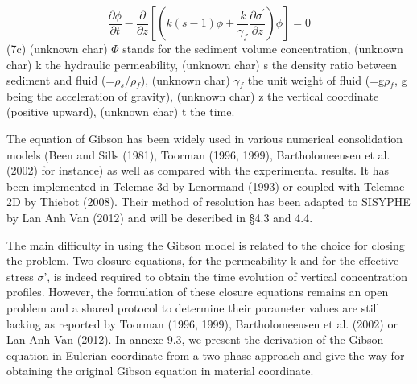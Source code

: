 \begin{equation*}
\dfrac{\partial \phi }{\partial t} -\dfrac{\partial }{\partial z} \left[
\left( k(s-1)\phi +\dfrac{k}{\gamma _{f} } \dfrac{\partial \sigma ^{\prime }%
}{\partial z} \right) \phi \right] =0 
\end{equation*}%
\hspace{5mm} \hspace{5mm} (7c)\newline
(unknown char)\hspace{5mm} $\Phi$ stands for the sediment volume
concentration, \newline
(unknown char)\hspace{5mm} k the hydraulic permeability,\newline
(unknown char)\hspace{5mm} s the density ratio between sediment and fluid (=$%
\rho$$_{s}$/$\rho$$_{f}$), \newline
(unknown char)\hspace{5mm} $\gamma$$_{f}$ the unit weight of fluid (=g$\rho$$%
_{f}$, g being the acceleration of gravity), \newline
(unknown char)\hspace{5mm} z the vertical coordinate (positive upward),%
\newline
(unknown char)\hspace{5mm} t the time.

The equation of Gibson has been widely used in various numerical
consolidation models (Been and Sills (1981), Toorman (1996, 1999),
Bartholomeeusen et al. (2002) for instance) as well as compared with the
experimental results. It has been implemented in Telemac-3d by Lenormand
(1993) or coupled with Telemac-2D by Thiebot (2008). Their method of
resolution has been adapted to SISYPHE by Lan Anh Van (2012) and will be
described in {\S }4.3 and 4.4.

The main difficulty in using the Gibson model is related to the choice for
closing the problem. Two closure equations, for the permeability k and for
the effective stress $\sigma$', is indeed required to obtain the time
evolution of vertical concentration profiles. However, the formulation of
these closure equations remains an open problem and a shared protocol to
determine their parameter values are still lacking as reported by Toorman
(1996, 1999), Bartholomeeusen et al. (2002) or Lan Anh Van (2012). In annexe
9.3, we present the derivation of the Gibson equation in Eulerian coordinate
from a two-phase approach and give the way for obtaining the original Gibson
equation in material coordinate.

